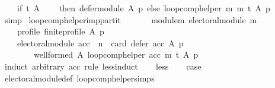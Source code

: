 \begin{isabellebody}
\ \ \ \ {\isacharparenleft}{\kern0pt}if\ {\isacharparenleft}{\kern0pt}t\ {\isacharparenleft}{\kern0pt}{\isacharbraceleft}{\kern0pt}{\isacharbraceright}{\kern0pt}{\isacharcomma}{\kern0pt}{\isacharbraceleft}{\kern0pt}{\isacharbraceright}{\kern0pt}{\isacharcomma}{\kern0pt}A{\isacharparenright}{\kern0pt}{\isacharparenright}{\kern0pt}\isanewline
\ \ \ \ then\ {\isacharparenleft}{\kern0pt}defer{\isacharunderscore}{\kern0pt}module\ A\ p{\isacharparenright}{\kern0pt}\ else\ {\isacharparenleft}{\kern0pt}loop{\isacharunderscore}{\kern0pt}comp{\isacharunderscore}{\kern0pt}helper\ m\ m\ t{\isacharparenright}{\kern0pt}\ A\ p{\isacharparenright}{\kern0pt}{\isachardoublequoteclose}\isanewline
%
\isadelimproof
\ \ %
\endisadelimproof
%
\isatagproof
{}\isamarkupfalse%
\ simp%
\endisatagproof
{\isafoldproof}%
%
\isadelimproof
\isanewline
%
\endisadelimproof
\isanewline
{}\isamarkupfalse%
\ loop{\isacharunderscore}{\kern0pt}comp{\isacharunderscore}{\kern0pt}helper{\isacharunderscore}{\kern0pt}imp{\isacharunderscore}{\kern0pt}partit{\isacharcolon}{\kern0pt}\isanewline
\ \ \isanewline
\ \ \ \ module{\isacharunderscore}{\kern0pt}m{\isacharcolon}{\kern0pt}\ {\isachardoublequoteopen}electoral{\isacharunderscore}{\kern0pt}module\ m{\isachardoublequoteclose}\ \isanewline
\ \ \ \ profile{\isacharcolon}{\kern0pt}\ {\isachardoublequoteopen}finite{\isacharunderscore}{\kern0pt}profile\ A\ p{\isachardoublequoteclose}\isanewline
\ \ \isanewline
\ \ \ \ {\isachardoublequoteopen}electoral{\isacharunderscore}{\kern0pt}module\ acc\ {\isasymand}\ {\isacharparenleft}{\kern0pt}n\ {\isacharequal}{\kern0pt}\ card\ {\isacharparenleft}{\kern0pt}defer\ acc\ A\ p{\isacharparenright}{\kern0pt}{\isacharparenright}{\kern0pt}\ {\isasymLongrightarrow}\isanewline
\ \ \ \ \ \ \ \ well{\isacharunderscore}{\kern0pt}formed\ A\ {\isacharparenleft}{\kern0pt}loop{\isacharunderscore}{\kern0pt}comp{\isacharunderscore}{\kern0pt}helper\ acc\ m\ t\ A\ p{\isacharparenright}{\kern0pt}{\isachardoublequoteclose}\isanewline
%
\isadelimproof
%
\endisadelimproof
%
\isatagproof
{}\isamarkupfalse%
\ {\isacharparenleft}{\kern0pt}induct\ arbitrary{\isacharcolon}{\kern0pt}\ acc\ rule{\isacharcolon}{\kern0pt}\ less{\isacharunderscore}{\kern0pt}induct{\isacharparenright}{\kern0pt}\isanewline
\ \ \isamarkupfalse%
\ {\isacharparenleft}{\kern0pt}less{\isacharparenright}{\kern0pt}\isanewline
\ \ \isamarkupfalse%
\ {\isacharquery}{\kern0pt}case\isanewline
\ \ \ \ \isamarkupfalse%
\ electoral{\isacharunderscore}{\kern0pt}module{\isacharunderscore}{\kern0pt}def\ loop{\isacharunderscore}{\kern0pt}comp{\isacharunderscore}{\kern0pt}helper{\isachardot}{\kern0pt}simps{\isacharparenleft}{\kern0pt}{}{\isacharparenright}{\kern0pt}\isanewline

\end{isabellebody}
